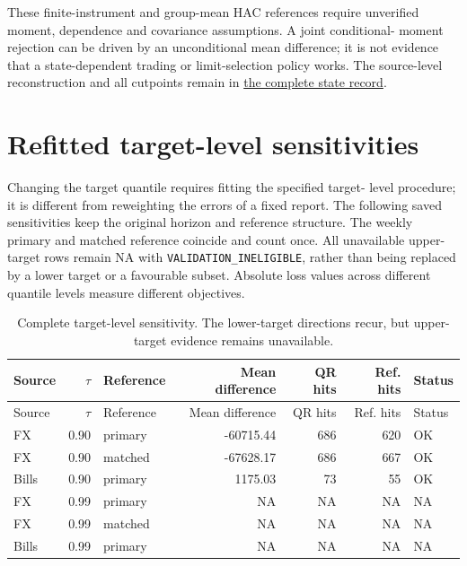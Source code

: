 \documentclass[11pt,a4paper]{article}
\begin{document}
These finite-instrument and group-mean HAC references require
unverified moment, dependence and covariance assumptions. A joint conditional-
moment rejection can be driven by an unconditional mean difference; it is not
evidence that a state-dependent trading or limit-selection policy works.
The source-level reconstruction and all cutpoints remain in
\href{https://github.com/ByronLi0207/financial-mathematics-paper-20261020/blob/revision-v7-final/results/revision-20261023/v6/wp4-states.json}{the complete state record}.\section{Refitted target-level sensitivities}\label{sup:wp5}

Changing the target quantile requires fitting the specified target-
level procedure; it is different from reweighting the errors of a fixed report.
The following saved sensitivities keep the original horizon and reference
structure. The weekly primary and matched reference coincide and count once.
All unavailable upper-target rows remain NA with
\texttt{VALIDATION\_INELIGIBLE}, rather than being replaced by a lower target
or a favourable subset. Absolute loss values across different quantile levels
measure different objectives.
\begingroup
\scriptsize
\setlength{\tabcolsep}{3pt}
\renewcommand{\arraystretch}{1.12}
\begin{longtable}{lrp{20mm}rrrl}
\caption{Complete target-level sensitivity. The lower-target directions recur, but upper-target evidence remains unavailable.}\\
\toprule
Source & \(\tau\) & Reference & Mean difference & QR hits & Ref. hits & Status \\
\midrule
\endfirsthead
\toprule
Source & \(\tau\) & Reference & Mean difference & QR hits & Ref. hits & Status \\
\midrule
\endhead
\bottomrule
\endfoot
FX & 0.90 & primary & -60715.44 & 686 & 620 & OK \\
FX & 0.90 & matched & -67628.17 & 686 & 667 & OK \\
Bills & 0.90 & primary & 1175.03 & 73 & 55 & OK \\
FX & 0.99 & primary & NA & NA & NA & NA \\
FX & 0.99 & matched & NA & NA & NA & NA \\
Bills & 0.99 & primary & NA & NA & NA & NA \\
\end{longtable}
\endgroup
\end{document}

